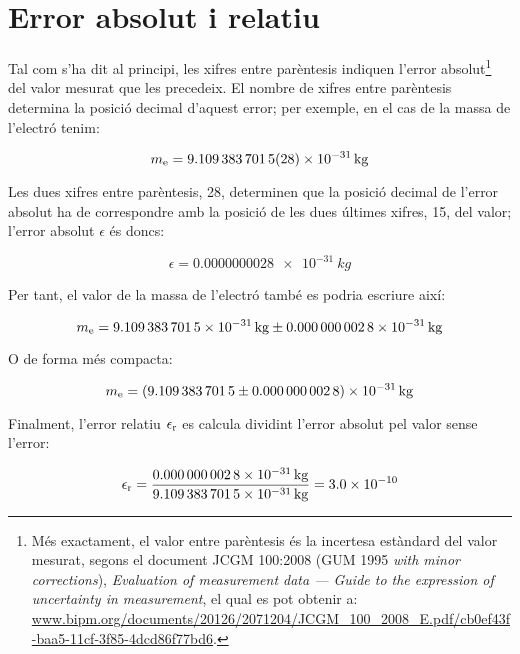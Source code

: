  
  
 
   
  
  
  
  
  
 \index{$\sigma$}  


\section{Error absolut i relatiu}\label{sec:err_abs_rel}

Tal com s'ha dit al principi, les xifres entre parèntesis indiquen l'error absolut\footnote{Més exactament, el valor entre parèntesis és la incertesa estàndard del valor mesurat, segons el document JCGM 100:2008 (GUM 1995 \textit{with minor
	corrections}), \textit{Evaluation of measurement data --- Guide to the expression of uncertainty in
	measurement}, el qual es pot obtenir a:  \href{https://www.bipm.org/documents/20126/2071204/JCGM\_100\_2008\_E.pdf/cb0ef43f-baa5-11cf-3f85-4dcd86f77bd6}{www.bipm.org/documents/20126/2071204/JCGM\_100\_2008\_E.pdf/cb0ef43f-baa5-11cf-3f85-4dcd86f77bd6}.} del valor mesurat que les precedeix. El nombre de xifres entre parèntesis determina la posició decimal d'aquest error; per exemple, en el cas de la  massa de l'electró tenim:

\[
    m_\mathrm{e} = \qty{9,109 383 7015(28) e-31}{kg}
\]

Les dues xifres entre parèntesis, 28, determinen que la posició decimal de l'error absolut ha de correspondre amb la posició de les dues últimes xifres, 15, del valor; l'error absolut $\epsilon$  és doncs:

\[
    \epsilon = \qty{0,000 000 0028 e-31}{kg}
\]

Per tant, el valor de la massa de l'electró també es podria escriure així:

 \[
    m\ped{e} = \qty[separate-uncertainty,separate-uncertainty-units = repeat]{9,109 383 7015(28) e-31}{kg}
\]

O de forma més compacta:

\[
m\ped{e} = \qty[separate-uncertainty,separate-uncertainty-units = bracket]{9,109 383 7015(28) e-31}{kg}
\]

Finalment, l'error relatiu $\epsilon_\mathrm{r}$ es calcula dividint l'error absolut pel valor sense l'error:

\[
    \epsilon_\mathrm{r} = \frac{\qty{0,000 000 0028 e-31}{kg}}{\qty{9,109 383 7015 e-31}{kg}} =   \num{3,0e-10}
\]
